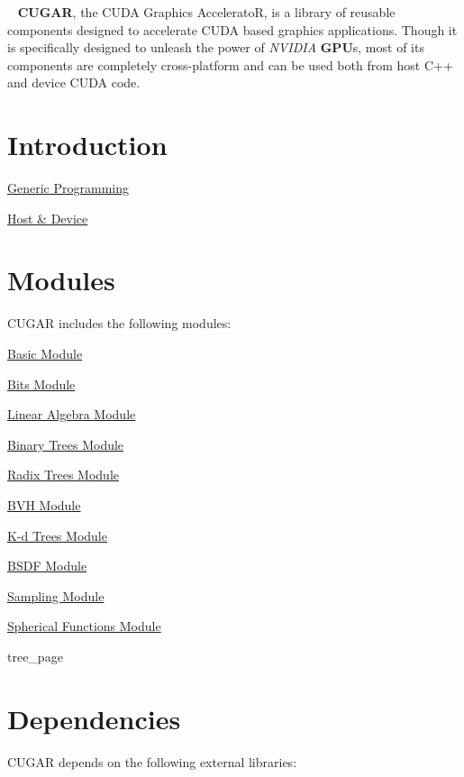 

\begin{DoxyParagraph}{}
~\newline
 {\bfseries C\+U\+G\+AR}, the C\+U\+DA Graphics AcceleratoR, is a library of reusable components designed to accelerate C\+U\+DA based graphics applications. Though it is specifically designed to unleash the power of {\itshape N\+V\+I\+D\+IA} {\bfseries G\+PU}s, most of its components are completely cross-\/platform and can be used both from host C++ and device C\+U\+DA code.
\end{DoxyParagraph}
\hypertarget{cugar_page_IntroductionSection}{}\section{Introduction}\label{cugar_page_IntroductionSection}

\begin{DoxyItemize}
\item \hyperlink{generic_programming_page}{Generic Programming}
\item \hyperlink{host_device_page}{Host \& Device}
\end{DoxyItemize}\hypertarget{cugar_page_ModulesSection}{}\section{Modules}\label{cugar_page_ModulesSection}
\begin{DoxyParagraph}{}
C\+U\+G\+AR includes the following modules\+:
\end{DoxyParagraph}

\begin{DoxyItemize}
\item \hyperlink{basic_page}{Basic Module}
\item \hyperlink{bits_page}{Bits Module}
\item \hyperlink{linalg_page}{Linear Algebra Module}
\item \hyperlink{bintree_page}{Binary Trees Module}
\item \hyperlink{radixtree_page}{Radix Trees Module}
\item \hyperlink{bvh_page}{B\+VH Module}
\item \hyperlink{kd_page}{K-\/d Trees Module}
\item \hyperlink{bsdf_page}{B\+S\+DF Module}
\item \hyperlink{sampling_page}{Sampling Module}
\item \hyperlink{spherical_page}{Spherical Functions Module}
\item tree\+\_\+page
\end{DoxyItemize}\hypertarget{cugar_page_DependenciesSection}{}\section{Dependencies}\label{cugar_page_DependenciesSection}
\begin{DoxyParagraph}{}
C\+U\+G\+AR depends on the following external libraries\+:
\end{DoxyParagraph}

